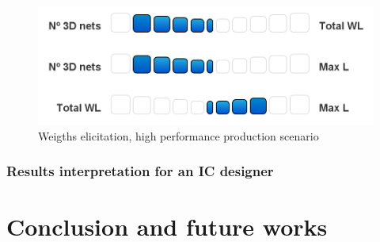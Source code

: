 \documentclass{svmult}
\begin{document}
\begin{figure}[h!]
    \centering
    \includegraphics[width=0.62\linewidth]{elicitperf.png}
    \caption{Weigths elicitation, high performance production scenario}
    \label{fig:elicitperf}
\end{figure}

\subsubsection{Results interpretation for an IC designer}

\section{Conclusion and future works}




\end{document}
